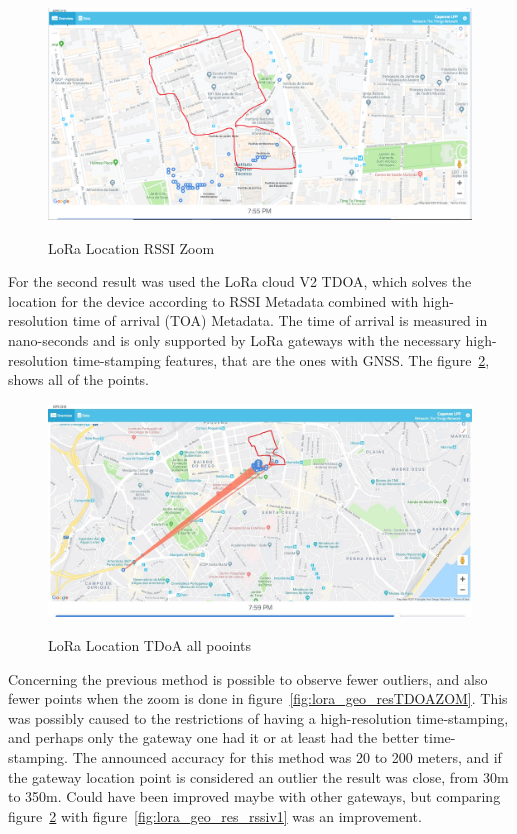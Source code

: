 \begin{figure}[htbp]
  \centering
  
    {\includegraphics[width=0.8\linewidth]{Chapters/Figures/lorageores21-1.PNG}}%
 
  \caption{LoRa Location RSSI Zoom}
  \label{fig:lora_geo_res_RSSIV1_Zoom}
\end{figure}





For the second result was used the LoRa cloud V2 TDOA, which solves the location for the device according to RSSI Metadata combined with high-resolution time of arrival (TOA) Metadata. The time of arrival is measured in nano-seconds and is only supported by LoRa gateways with the necessary high-resolution time-stamping features, that are the ones with GNSS. The figure~\ref{fig:lora_geo_resTDOA1}, shows all of the points.
\begin{figure}[htbp]
  \centering
  
    {\includegraphics[width=0.8\linewidth]{Chapters/Figures/lorageores25-2.jpg}}%
 
  \caption{LoRa Location TDoA all pooints}
  \label{fig:lora_geo_resTDOA1}
\end{figure}

Concerning the previous method is possible to observe fewer outliers, and also fewer points when the zoom is done in figure~\ref{fig:lora_geo_resTDOAZOM}. This was possibly caused to the restrictions of having a high-resolution time-stamping, and perhaps only the gateway one had it or at least had the better time-stamping. The announced accuracy for this method was 20 to 200 meters, and if the gateway location point is considered an outlier the result was close, from 30m to 350m. Could have been improved maybe with other gateways, but comparing figure~\ref{fig:lora_geo_resTDOA1} with figure~\ref{fig:lora_geo_res_rssiv1} was an improvement.

